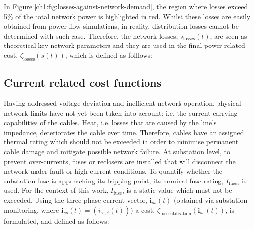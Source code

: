 


In Figure \ref{ch1:fig:losses-against-network-demand}, the region where losses exceed 5\% of the total network power is highlighted in red.
Whilst these losses are easily obtained from power flow simulations, in reality, distribution losses cannot be determined with such ease.
Therefore, the network losses, $s_\text{losses}(t)$, are seen as theoretical key network parameters and they are used in the final power related cost, $\zeta_\text{losses}(s(t))$, which is defined as folllows:



\subsection{Current related cost functions}
\label{ch1:subsec:currents-related-cost-functions}


Having addressed voltage deviation and inefficient network operation, physical network limits have not yet been taken into account: i.e. the current carrying capabilities of the cables.
Heat, i.e. losses that are caused by the line's impedance, deteriorates the cable over time.
Therefore, cables have an assigned thermal rating which should not be exceeded in order to minimise permanent cable damage and mitigate possible network failure.
At substation level, to prevent over-currents, fuses or reclosers are installed that will disconnect the network under fault or high current conditions.
To quantify whether the substation fuse is approaching its tripping point, its nominal fuse rating, $I_\text{fuse}$, is used.
For the context of this work, $I_\text{fuse}$, is a static value which must not be exceeded.
Using the three-phase current vector, $\textbf{i}_{ss}(t)$ (obtained via substation monitoring, where $\textbf{i}_{ss}(t) = (i_{\text{ss},\phi}(t))$) a cost, $\zeta_\text{fuse utilisation}(\textbf{i}_{ss}(t))$, is formulated, and defined as follows:

